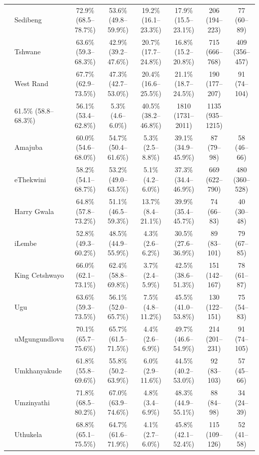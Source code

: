\documentclass{article}
\begin{document}
\begin{landscape}
{\begin{longtable}[c]{llc cc ccc}
      & Sedibeng & 72.9\% (68.5--78.7\%) & 53.6\% (49.8--59.9\%) & 19.2\% (16.1--23.3\%) & 17.9\% (15.5--23.1\%) & 206 (194--223) & 77 (60--89) \\
      & Tshwane & 63.6\% (59.3--68.3\%) & 42.9\% (39.2--47.6\%) & 20.7\% (17.7--24.8\%) & 16.8\% (15.2--20.8\%) & 715 (666--768) & 409 (356--457) \\
      & West Rand & 67.7\% (62.9--73.5\%) & 47.3\% (42.7--53.0\%) & 20.4\% (16.6--25.5\%) & 21.1\% (18.7--24.5\%) & 190 (177--207) & 91 (74--104) \\
      \pagebreak
      \multicolumn{2}{l}{\textbf{KwaZulu-Natal}} & 61.5\% (58.8--68.3\%) & 56.1\% (53.4--62.8\%) & 5.3\% (4.6--6.0\%) & 40.5\% (38.2--46.8\%) & 1810 (1731--2011) & 1135 (935--1215) \\
      & Amajuba & 60.0\% (54.6--68.0\%) & 54.7\% (50.4--61.6\%) & 5.3\% (2.5--8.8\%) & 39.1\% (34.9--45.9\%) & 87 (79--98) & 58 (46--66) \\
      & eThekwini & 58.2\% (54.1--68.7\%) & 53.2\% (49.0--63.5\%) & 5.1\% (4.2--6.0\%) & 37.3\% (34.4--46.9\%) & 669 (622--790) & 480 (360--528) \\
      & Harry Gwala & 64.8\% (57.8--73.2\%) & 51.1\% (46.5--59.3\%) & 13.7\% (8.4--21.1\%) & 39.9\% (35.4--45.7\%) & 74 (66--83) & 40 (30--48) \\
      & iLembe & 52.8\% (49.3--60.2\%) & 48.5\% (44.9--55.9\%) & 4.3\% (2.6--6.2\%) & 30.5\% (27.6--36.9\%) & 89 (83--101) & 79 (67--85) \\
      & King Cetshwayo & 66.0\% (62.1--73.1\%) & 62.4\% (58.8--69.8\%) & 3.7\% (2.4--5.9\%) & 42.5\% (38.6--51.3\%) & 151 (142--167) & 78 (61--87) \\
      & Ugu & 63.6\% (59.3--73.5\%) & 56.1\% (52.0--65.7\%) & 7.5\% (4.8--11.2\%) & 45.5\% (41.0--53.8\%) & 130 (122--151) & 75 (54--83) \\
      & uMgungundlovu & 70.1\% (65.7--75.6\%) & 65.7\% (61.5--71.5\%) & 4.4\% (2.6--6.9\%) & 49.7\% (46.6--54.9\%) & 214 (201--231) & 91 (74--105) \\
      & Umkhanyakude & 61.8\% (55.8--69.6\%) & 55.8\% (50.2--63.9\%) & 6.0\% (2.9--11.6\%) & 44.5\% (40.2--53.0\%) & 92 (83--103) & 57 (45--66) \\
      & Umzinyathi & 71.8\% (68.5--80.2\%) & 67.0\% (63.9--74.6\%) & 4.8\% (3.4--6.9\%) & 48.3\% (44.9--55.1\%) & 88 (84--98) & 34 (24--39) \\
      & Uthukela & 68.8\% (65.1--75.5\%) & 64.7\% (61.6--71.9\%) & 4.1\% (2.7--6.0\%) & 45.8\% (42.1--52.4\%) & 115 (109--126) & 52 (41--58) \\

\end{longtable}}
\end{landscape}
\end{document}
